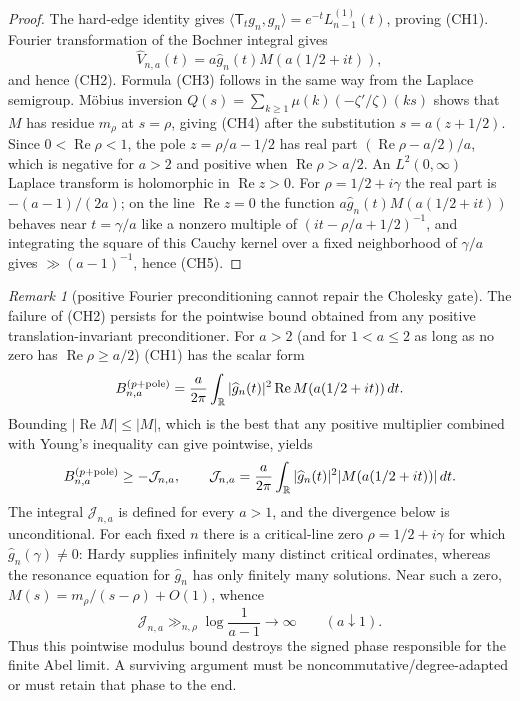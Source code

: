 \documentclass[11pt]{amsart}
\theoremstyle{definition}
\theoremstyle{remark}
\newtheorem{remark}[theorem]{Remark}
\theoremstyle{definition}
\renewcommand{\Re}{\operatorname{Re}}
\begin{document}
\begin{proof}
The hard-edge identity gives
$\langle \mathsf T_tg_n,g_n\rangle=e^{-t}L_{n-1}^{(1)}(t)$, proving
(CH1).  Fourier transformation of the Bochner integral gives
\[
 \widehat V_{n,a}(t)=a\widehat g_n(t)M(a(1/2+it)),
\]
and hence (CH2).  Formula (CH3) follows in the same way from the Laplace
semigroup.  Möbius inversion
$Q(s)=\sum_{k\ge1}\mu(k)(-\zeta'/\zeta)(ks)$ shows that $M$ has residue
$m_\rho$ at $s=\rho$, giving (CH4) after the substitution $s=a(z+1/2)$.
Since $0<\Re\rho<1$, the pole $z=\rho/a-1/2$ has real part
$(\Re\rho-a/2)/a$, which is negative for $a>2$ and positive when
$\Re\rho>a/2$.  An $L^2(0,\infty)$ Laplace transform is holomorphic in
$\Re z>0$.  For $\rho=1/2+i\gamma$ the real part is $-(a-1)/(2a)$; on the
line $\Re z=0$ the function $a\widehat g_n(t)M(a(1/2+it))$ behaves near
$t=\gamma/a$ like a nonzero multiple of $(it-\rho/a+1/2)^{-1}$, and
integrating the square of this Cauchy kernel over a fixed neighborhood of
$\gamma/a$ gives $\gg(a-1)^{-1}$, hence (CH5).
\end{proof}

\begin{remark}[positive Fourier preconditioning cannot repair the Cholesky gate]
\label{rmk:a1-euler-resolvent-gate}
The failure of (CH2) persists for the pointwise bound obtained from any
positive translation-invariant preconditioner.  For $a>2$ (and for
$1<a\le2$ as long as no zero has $\Re\rho\ge a/2$) (CH1) has the scalar form
\[
 B_{n,a}^{(p+{\rm pole})}
 =\frac a{2\pi}\int_{\mathbb R}|\widehat g_n(t)|^2
   \Re M(a(1/2+it))\,dt.
\]
Bounding $|\Re M|\le|M|$, which is the best that any positive multiplier
combined with Young's inequality can give pointwise, yields
\[
 B_{n,a}^{(p+{\rm pole})}\ge-\mathcal J_{n,a},
 \qquad
 \mathcal J_{n,a}=\frac a{2\pi}\int_{\mathbb R}
 |\widehat g_n(t)|^2|M(a(1/2+it))|\,dt.
\]
The integral $\mathcal J_{n,a}$ is defined for every $a>1$, and the
divergence below is unconditional.
For each fixed $n$ there is a critical-line zero
$\rho=1/2+i\gamma$ for which $\widehat g_n(\gamma)\ne0$: Hardy supplies
infinitely many distinct critical ordinates, whereas the resonance equation
for $\widehat g_n$ has only finitely many solutions.  Near such a zero,
$M(s)=m_\rho/(s-\rho)+O(1)$, whence
\[
 \mathcal J_{n,a}\gg_{n,\rho}\log\frac1{a-1}\longrightarrow\infty
 \qquad(a\downarrow1).
\]
Thus this pointwise modulus bound destroys the
signed phase responsible for the finite Abel limit.  A surviving argument
must be noncommutative/degree-adapted or must retain that phase to the end.
\end{remark}
\end{document}
